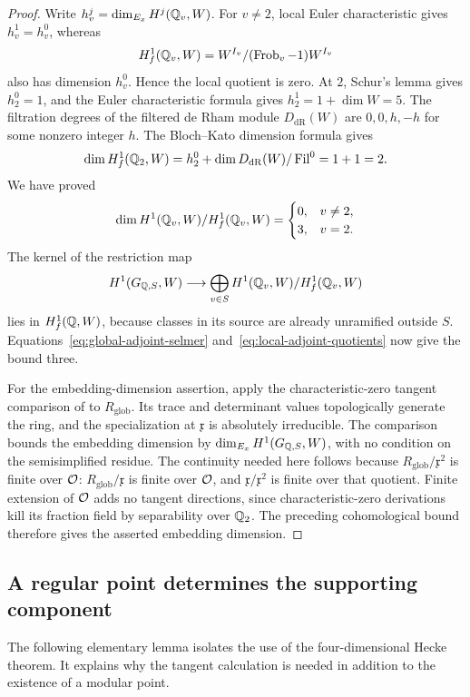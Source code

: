 \begin{proof}
Write $h^j_v=\dim_{E_x}H^j(\mathbb Q_v,W)$.
For $v\ne2$, local Euler characteristic gives $h^1_v=h^0_v$,
whereas
\[
 H^1_f(\mathbb Q_v,W)=W^{I_v}/(\operatorname{Frob}_v-1)W^{I_v}
\]
also has dimension $h^0_v$.  Hence the local quotient is zero.
At $2$, Schur's lemma gives $h^0_2=1$, and the Euler
characteristic formula gives $h^1_2=1+\dim W=5$.
The filtration degrees of the filtered de Rham module
$D_{\mathrm{dR}}(W)$ are
$0,0,h,-h$ for some nonzero integer $h$.  The Bloch--Kato
dimension formula \cite[Corollary~3.8.4]{BlochKato1990} gives
\[
 \dim H^1_f(\mathbb Q_2,W)
 =h^0_2+
   \dim D_{\mathrm{dR}}(W)/\operatorname{Fil}^0=1+1=2.
\]
We have proved
\begin{equation}\label{eq:local-adjoint-quotients}
 \dim H^1(\mathbb Q_v,W)/H^1_f(\mathbb Q_v,W)
 =\begin{cases}0,&v\ne2,\\3,&v=2.\end{cases}
\end{equation}
The kernel of the restriction map
\[
 H^1(G_{\mathbb Q,S},W)\longrightarrow
 \bigoplus_{v\in S} H^1(\mathbb Q_v,W)/H^1_f(\mathbb Q_v,W)
\]
lies in $H^1_f(\mathbb Q,W)$, because classes in its source are already
unramified outside $S$.  Equations~\eqref{eq:global-adjoint-selmer}
and~\eqref{eq:local-adjoint-quotients} now give the bound three.

For the embedding-dimension assertion, apply the characteristic-zero
tangent comparison of \cite[Proposition~4.1]{Dim} to
$R_{\mathrm{glob}}$. Its trace and determinant values topologically
generate the ring, and the specialization at $\mathfrak x$ is
absolutely irreducible. The comparison bounds the embedding dimension by
$\dim_{E_x}H^1(G_{\mathbb Q,S},W)$, with no condition on the
semisimplified residue. The continuity needed here follows because
$R_{\mathrm{glob}}/\mathfrak x^2$ is finite over $\mathcal O$:
$R_{\mathrm{glob}}/\mathfrak x$ is finite over $\mathcal O$, and
$\mathfrak x/\mathfrak x^2$ is finite over that quotient.
Finite extension of $\mathcal O$ adds no tangent directions, since
characteristic-zero derivations kill its fraction field by
separability over $\mathbb Q_2$. The preceding cohomological bound therefore
gives the asserted embedding dimension.
\end{proof}

\subsection{A regular point determines the supporting component}

The following elementary lemma isolates the use of the
four-dimensional Hecke theorem.  It explains why the tangent
calculation is needed in addition to the existence of a modular point.

